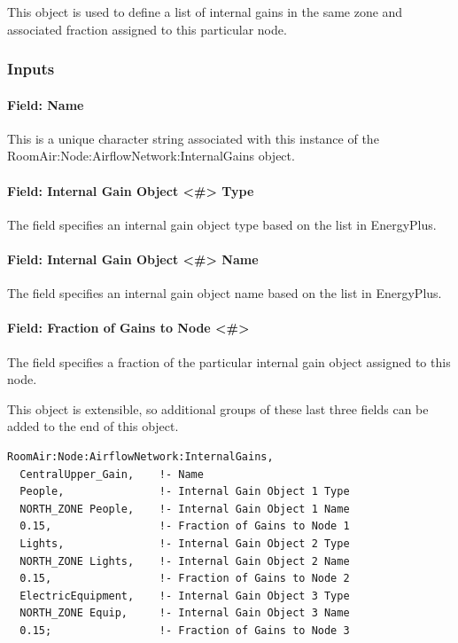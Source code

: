 This object is used to define a list of internal gains in the same zone and associated fraction assigned to this particular node.

\subsubsection{Inputs}\label{inputs-14-012}

\paragraph{Field: Name}\label{field-name-10-014}

This is a unique character string associated with this instance of the Room\-Air:\-Node:\-Air\-flow\-Net\-work:\-Internal\-Gains object.

\paragraph{Field: Internal Gain Object \textless{}\#\textgreater{} Type}\label{field-internal-gain-object-x-type}

The field specifies an internal gain object type based on the list in EnergyPlus.

\paragraph{Field: Internal Gain Object \textless{}\#\textgreater{} Name}\label{field-internal-gain-object-x-name}

The field specifies an internal gain object name based on the list in EnergyPlus.

\paragraph{Field: Fraction of Gains to Node \textless{}\#\textgreater{}}\label{field-fraction-of-gains-to-node-x}

The field specifies a fraction of the particular internal gain object assigned to this node.

This object is extensible, so additional groups of these last three fields can be added to the end of this object.

\begin{lstlisting}
RoomAir:Node:AirflowNetwork:InternalGains,
  CentralUpper_Gain,    !- Name
  People,               !- Internal Gain Object 1 Type
  NORTH_ZONE People,    !- Internal Gain Object 1 Name
  0.15,                 !- Fraction of Gains to Node 1
  Lights,               !- Internal Gain Object 2 Type
  NORTH_ZONE Lights,    !- Internal Gain Object 2 Name
  0.15,                 !- Fraction of Gains to Node 2
  ElectricEquipment,    !- Internal Gain Object 3 Type
  NORTH_ZONE Equip,     !- Internal Gain Object 3 Name
  0.15;                 !- Fraction of Gains to Node 3
\end{lstlisting}

